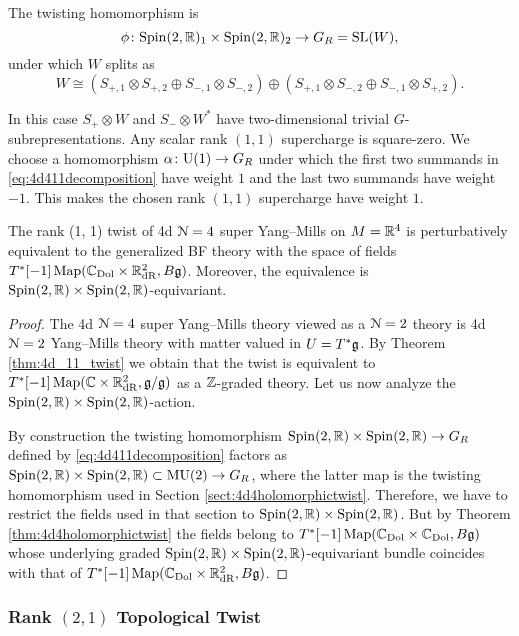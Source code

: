 \documentclass[10pt, oneside]{article}
\begin{document}
The twisting homomorphism is
\[
\phi \colon \mathrm{Spin}(2, \mathbb R)_1 \times \mathrm{Spin}(2, \mathbb R)_2 \to G_R=\mathrm{SL}(W),
\]
under which $W$ splits as
\begin{equation}
W\cong (S_{+, 1}\otimes S_{+, 2}\oplus S_{-, 1}\otimes S_{-, 2})\oplus (S_{+, 1}\otimes S_{-, 2}\oplus S_{-, 1}\otimes S_{+, 2}).
\label{eq:4d411decomposition}
\end{equation}

In this case $S_+\otimes W$ and $S_-\otimes W^*$ have two-dimensional trivial $G$-subrepresentations. Any scalar rank $(1, 1)$ supercharge is square-zero. We choose a homomorphism $\alpha\colon \mathrm{U}(1)\rightarrow G_R$ under which the first two summands in \eqref{eq:4d411decomposition} have weight $1$ and the last two summands have weight $-1$. This makes the chosen rank $(1, 1)$ supercharge have weight $1$.

\begin{theorem}
The rank (1, 1) twist of 4d $\mathcal N=4$ super Yang--Mills on $M=\mathbb R^4$ is perturbatively equivalent to the generalized BF theory with the space of fields $T^*[-1] \operatorname{Map}(\mathbb C_{\rm Dol}\times \mathbb R^2_{\mathrm{dR}}, B \mathfrak g)$. Moreover, the equivalence is $\mathrm{Spin}(2, \mathbb R)\times \mathrm{Spin}(2, \mathbb R)$-equivariant.
\label{thm:4d4partialtwist}
\end{theorem}
\begin{proof}
The 4d $\mathcal N=4$ super Yang--Mills theory viewed as a $\mathcal N=2$ theory is 4d $\mathcal N=2$ Yang--Mills theory with matter valued in $U=T^*\mathfrak g$. By Theorem \ref{thm:4d_11_twist} we obtain that the twist is equivalent to $T^*[-1]\operatorname{Map}(\mathbb C\times \mathbb R^2_{\mathrm{dR}}, \mathfrak g/\mathfrak g)$ as a $\mathbb Z$-graded theory. Let us now analyze the $\mathrm{Spin}(2, \mathbb R)\times \mathrm{Spin}(2, \mathbb R)$-action.

By construction the twisting homomorphism $\mathrm{Spin}(2,\mathbb R)\times \mathrm{Spin}(2, \mathbb R)\rightarrow G_R$ defined by \eqref{eq:4d411decomposition} factors as $\mathrm{Spin}(2, \mathbb R)\times \mathrm{Spin}(2, \mathbb R)\subset \mathrm{MU}(2)\rightarrow G_R$, where the latter map is the twisting homomorphism used in Section \ref{sect:4d4holomorphictwist}. Therefore, we have to restrict the fields used in that section to $\mathrm{Spin}(2, \mathbb R)\times \mathrm{Spin}(2, \mathbb R)$. But by Theorem \ref{thm:4d4holomorphictwist} the fields belong to $T^*[-1]\operatorname{Map}(\mathbb C_{\rm Dol}\times \mathbb C_{\rm Dol}, B\mathfrak g)$ whose underlying graded $\mathrm{Spin}(2, \mathbb R)\times \mathrm{Spin}(2, \mathbb R)$-equivariant bundle coincides with that of $T^*[-1]\operatorname{Map}(\mathbb C_{\rm Dol}\times \mathbb R^2_{\mathrm{dR}}, B\mathfrak g)$.
\end{proof}

\subsubsection{Rank \texorpdfstring{$(2,1)$}{(2,1)} Topological Twist}
\end{document}
